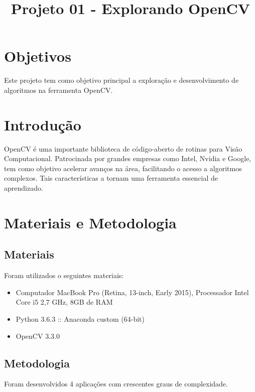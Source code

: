 \documentclass[conference]{IEEEtran}
\begin{document}
\title{Projeto 01 - Explorando OpenCV}

\author{
}

\maketitle

\section{Objetivos}
Este projeto tem como objetivo principal a exploração e desenvolvimento de algoritmos na ferramenta OpenCV\cite{opencv_library}. 
\section{Introdução}
OpenCV é uma importante biblioteca de código-aberto de rotinas para Visão Computacional\cite{forsyth}.  Patrocinada por grandes empresas como Intel, Nvidia e Google, tem como objetivo acelerar avanços na área, facilitando o acesso a algoritmos complexos\cite{opencv_library}. Tais características a tornam uma ferramenta essencial de aprendizado.
\section{Materiais e Metodologia}
\subsection{Materiais}
Foram utilizados o seguintes materiais:
\begin{itemize}
\item Computador MacBook Pro (Retina, 13-inch, Early 2015), Processador Intel Core i5 2,7 GHz, 8GB de RAM
\item Python 3.6.3 :: Anaconda custom (64-bit)
\item OpenCV 3.3.0
\end{itemize}
\subsection{Metodologia}
Foram desenvolvidos 4 aplicações com crescentes graus de complexidade. 
\end{document}
